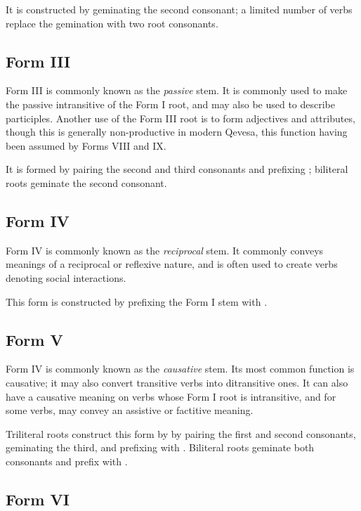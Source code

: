 \documentclass[grammar]{subfiles}
\begin{document}
  It is constructed by geminating the second consonant; a limited number of verbs replace the gemination with two root consonants. %

  \subsection{Form III}
  \label{ssec:dev_verb_form_iii}

  Form III is commonly known as the \emph{passive} stem.
  It is commonly used to make the passive intransitive of the Form I root, and may also be used to describe participles.
  Another use of the Form III root is to form adjectives and attributes, though this is generally non-productive in modern Qevesa, this function having been assumed by Forms VIII and IX.

  It is formed by pairing the second and third consonants and prefixing ; biliteral roots geminate the second consonant.

  \subsection{Form IV}
  \label{ssec:dev_verb_form_iv}

  Form IV is commonly known as the \emph{reciprocal} stem. 
  It commonly conveys meanings of a reciprocal or reflexive nature, and is often used to create verbs denoting social interactions.

  This form is constructed by prefixing the Form I stem with .

  \subsection{Form V}
  \label{ssec:dev_verb_form_v}

  Form IV is commonly known as the \emph{causative} stem. 
  Its most common function is causative; it may also convert transitive verbs into ditransitive ones.
  It can also have a causative meaning on verbs whose Form I root is intransitive, and for some verbs, may convey an assistive or factitive meaning.

  Triliteral roots construct this form by by pairing the first and second consonants, geminating the third, and prefixing with .
  Biliteral roots geminate both consonants and prefix with .

  \subsection{Form VI}
  \label{ssec:dev_verb_form_vi}
\end{document}
